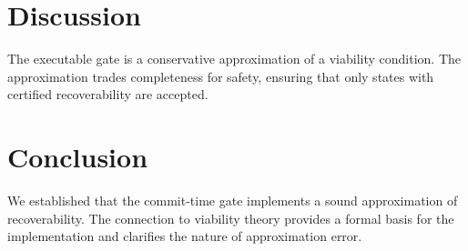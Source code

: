 \documentclass[letterpaper, 10 pt, conference]{ieeeconf}
\begin{document}
\section{Discussion}

The executable gate is a conservative approximation of a viability condition. The approximation trades completeness for safety, ensuring that only states with certified recoverability are accepted.

\section{Conclusion}

We established that the commit-time gate implements a sound approximation of recoverability. The connection to viability theory provides a formal basis for the implementation and clarifies the nature of approximation error.
\end{document}
